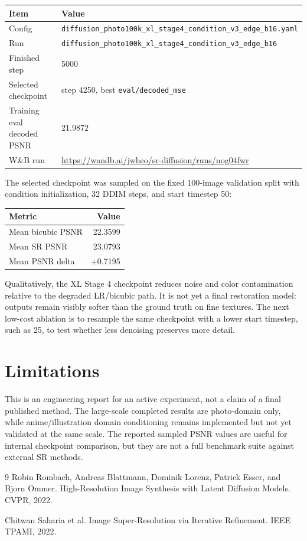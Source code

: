 \documentclass[10pt]{article}
\begin{document}
\begin{table}[H]
\centering
\begin{tabular}{ll}
\toprule
Item & Value \\
\midrule
Config & \texttt{diffusion\_photo100k\_xl\_stage4\_condition\_v3\_edge\_b16.yaml} \\
Run & \texttt{diffusion\_photo100k\_xl\_stage4\_condition\_v3\_edge\_b16} \\
Finished step & 5000 \\
Selected checkpoint & step 4250, best \texttt{eval/decoded\_mse} \\
Training eval decoded PSNR & 21.9872 \\
W\&B run & \url{https://wandb.ai/jwheo/sr-diffusion/runs/nog04fwr} \\
\bottomrule
\end{tabular}
\end{table}

The selected checkpoint was sampled on the fixed 100-image validation split
with condition initialization, 32 DDIM steps, and start timestep 50:

\begin{table}[H]
\centering
\begin{tabular}{lr}
\toprule
Metric & Value \\
\midrule
Mean bicubic PSNR & 22.3599 \\
Mean SR PSNR & 23.0793 \\
Mean PSNR delta & +0.7195 \\
\bottomrule
\end{tabular}
\end{table}

Qualitatively, the XL Stage 4 checkpoint reduces noise and color contamination
relative to the degraded LR/bicubic path. It is not yet a final restoration
model: outputs remain visibly softer than the ground truth on fine textures.
The next low-cost ablation is to resample the same checkpoint with a lower start
timestep, such as 25, to test whether less denoising preserves more detail.

\section{Limitations}

This is an engineering report for an active experiment, not a claim of a final
published method. The large-scale completed results are photo-domain only, while
anime/illustration domain conditioning remains implemented but not yet validated
at the same scale. The reported sampled PSNR values are useful for internal
checkpoint comparison, but they are not a full benchmark suite against external
SR methods.

\begin{thebibliography}{9}
Robin Rombach, Andreas Blattmann, Dominik Lorenz, Patrick Esser, and Bjorn
Ommer. High-Resolution Image Synthesis with Latent Diffusion Models. CVPR,
2022.

Chitwan Saharia et al. Image Super-Resolution via Iterative Refinement. IEEE
TPAMI, 2022.
\end{thebibliography}
\end{document}
